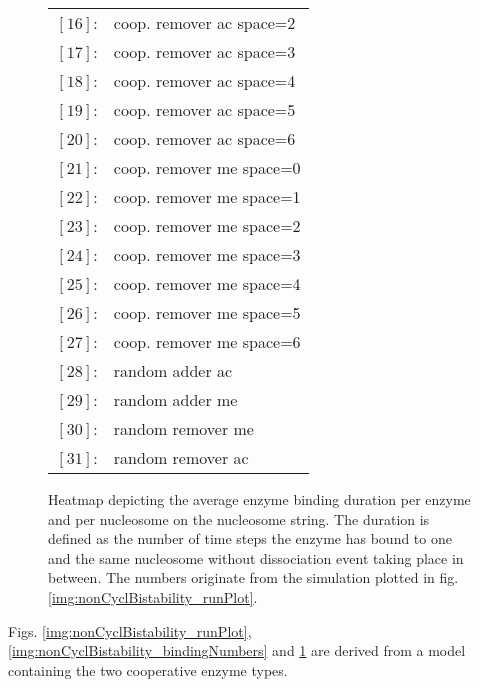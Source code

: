 \begin{figure}[htpb!]
\begin{center}
\begin{minipage}{.45\textwidth}
                    \begin{tabular}{l l}
                        $[16]$: & coop. remover ac space=2 \\
                        $[17]$: & coop. remover ac space=3 \\
                        $[18]$: & coop. remover ac space=4 \\
                        $[19]$: & coop. remover ac space=5 \\
                        $[20]$: & coop. remover ac space=6 \\\hline
                        $[21]$: & coop. remover me space=0 \\
                        $[22]$: & coop. remover me space=1 \\
                        $[23]$: & coop. remover me space=2 \\
                        $[24]$: & coop. remover me space=3 \\
                        $[25]$: & coop. remover me space=4 \\
                        $[26]$: & coop. remover me space=5 \\
                        $[27]$: & coop. remover me space=6 \\\hline
                        $[28]$: & random adder ac \\
                        $[29]$: & random adder me \\
                        $[30]$: & random remover me \\
                        $[31]$: & random remover ac \\
                        \hline \hline
                    \end{tabular}
                \end{minipage}
            \end{center}
                \caption{Heatmap depicting the average enzyme binding duration per enzyme and per nucleosome on the nucleosome string. The duration is defined as the number of time steps the enzyme has bound to one and the same nucleosome without dissociation event taking place in between. The numbers originate from the simulation plotted in fig. \ref{img:nonCyclBistability_runPlot}.}
                \label{img:nonCyclBistability_bindingTimeDuration}
            \end{figure}

            Figs. \ref{img:nonCyclBistability_runPlot}, \ref{img:nonCyclBistability_bindingNumbers} and \ref{img:nonCyclBistability_bindingTimeDuration} are derived from a model containing the two cooperative enzyme types.

